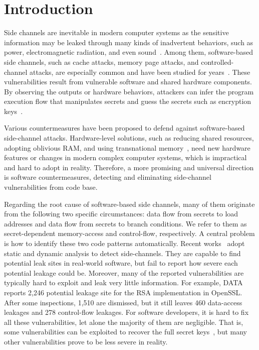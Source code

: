 \section{Introduction}
Side channels are inevitable in modern computer systems as the sensitive
information may be leaked through many kinds of inadvertent behaviors, such as power,
electromagnetic radiation, and even
sound~\cite{agrawal2002side,kar20178,chari1999towards,217605,genkin2014rsa}.
Among them, software-based side channels, such as cache attacks, memory page
attacks, and controlled-channel attacks, are especially common and have been
studied for
years~\cite{7163052,217543,217589,lee2017inferring,191010,liu2015last}. These
vulnerabilities result from vulnerable software and shared hardware components.
By observing the outputs or hardware behaviors, attackers can infer the program
execution flow that manipulates secrets and guess the secrets such as encryption
keys~\cite{Osvik2006,Gullasch:2011:CGB:2006077.2006784,203878,10.1007/978-3-540-45238-6_6}.

Various countermeasures have been proposed to defend against software-based
side-channel attacks. Hardware-level solutions, such as reducing shared
resources, adopting oblivious RAM, and using transnational
memory~\cite{203878,217537,shih2017t,Zhang:2015:HDL:2775054.2694372}, need new
hardware features or changes in modern complex computer systems, which is
impractical and hard to adopt in reality. Therefore, a more promising and
universal direction is software countermeasures, detecting and eliminating
side-channel vulnerabilities from code base.

Regarding the root cause of software-based side channels, many of them originate
from the following two specific circumstances: data flow from secrets to load
addresses and data flow from secrets to branch conditions. We refer to them as
 secret-dependent memory-access and control-flow, respectively. A
central problem is how to identify these two code patterns automatically. Recent
works~\cite{203878,217537,Wichelmann:2018:MFF:3274694.3274741,Brotzman19Casym,236338,182946}
adopt static and dynamic analysis to detect side-channels. They are capable to find
potential leak sites in real-world software, but fail to report how severe each
potential leakage could be. Moreover, many of the reported vulnerabilities are typically
hard to exploit and leak very little information. For example,
DATA~\cite{217537} reports 2,246 potential leakage site for the RSA
implementation in OpenSSL\@. After some inspections, 1,510 are dismissed, but it
still leaves 460 data-access leakages and 278 control-flow leakages. For software
developers, it is hard to fix all these vulnerabilities, let alone the majority
of them are negligible. That is, some vulnerabilities can be exploited to recover the
full secret keys~\cite{184415}, but many other vulnerabilities prove to be less
severe in reality.

